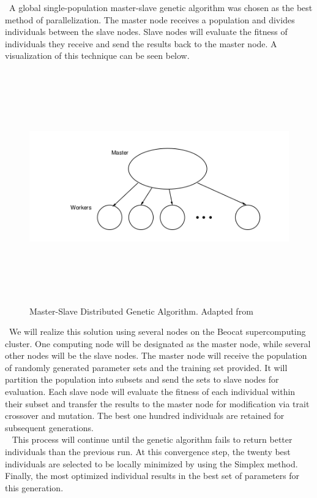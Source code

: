 \documentclass[letterpaper, 12pt]{article}
\begin{document}
\begin{flushleft}
 ~\newline A global single-population master-slave genetic algorithm was chosen as the best method of parallelization. The master node receives a population and divides individuals between the slave nodes.  Slave nodes will evaluate the fitness of individuals they receive and send the results back to the master node.  A visualization of this technique can be seen below.
 
 \begin{figure}[H]
 	\includegraphics[width=\linewidth,height=10cm,keepaspectratio]{model.png}
 	\caption[Master-Slave Genetic Algorithm Implementation]{Master-Slave Distributed Genetic Algorithm. Adapted from \cite{cantu1998survey}}
 	\label{fig:arch}
 \end{figure}

~\newline We will realize this solution using several nodes on the Beocat supercomputing cluster.   One computing node will be designated as the master node, while several other nodes will be the slave nodes.  The master node will receive the population of randomly generated parameter sets and the training set provided.  It will partition the population into subsets and send the sets to slave nodes for evaluation.  Each slave node will evaluate the fitness of each individual within their subset and transfer the results to the master node for modification via trait crossover and mutation. The best one hundred individuals are retained for subsequent generations.\\

~\newline
This process will continue until the genetic algorithm fails to return better individuals than the previous run.  At this convergence step, the twenty best individuals are selected to be locally minimized by using the Simplex method.  Finally, the most optimized individual results in the best set of parameters for this generation. \\


\end{flushleft}
\end{document}
